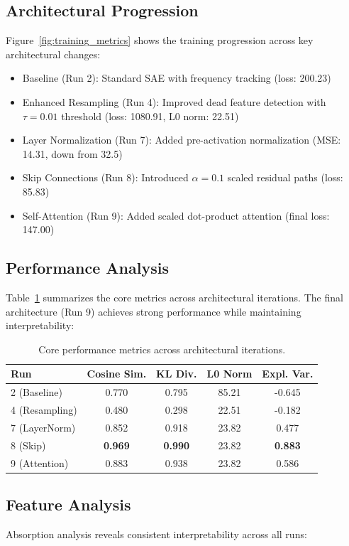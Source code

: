 \documentclass{article} %
\begin{document}
\subsection{Architectural Progression}
Figure~\ref{fig:training_metrics} shows the training progression across key architectural changes:

\begin{itemize}
    \item Baseline (Run 2): Standard SAE with frequency tracking (loss: 200.23)
    \item Enhanced Resampling (Run 4): Improved dead feature detection with $\tau=0.01$ threshold (loss: 1080.91, L0 norm: 22.51)
    \item Layer Normalization (Run 7): Added pre-activation normalization (MSE: 14.31, down from 32.5)
    \item Skip Connections (Run 8): Introduced $\alpha=0.1$ scaled residual paths (loss: 85.83)
    \item Self-Attention (Run 9): Added scaled dot-product attention (final loss: 147.00)
\end{itemize}

\subsection{Performance Analysis}
Table~\ref{tab:core_metrics} summarizes the core metrics across architectural iterations. The final architecture (Run 9) achieves strong performance while maintaining interpretability:

\begin{table}[h]
\centering
\begin{tabular}{lcccc}
\toprule
Run & Cosine Sim. & KL Div. & L0 Norm & Expl. Var. \\
\midrule
2 (Baseline) & 0.770 & 0.795 & 85.21 & -0.645 \\
4 (Resampling) & 0.480 & 0.298 & 22.51 & -0.182 \\
7 (LayerNorm) & 0.852 & 0.918 & 23.82 & 0.477 \\
8 (Skip) & \textbf{0.969} & \textbf{0.990} & 23.82 & \textbf{0.883} \\
9 (Attention) & 0.883 & 0.938 & 23.82 & 0.586 \\
\bottomrule
\end{tabular}
\caption{Core performance metrics across architectural iterations.}
\label{tab:core_metrics}
\end{table}

\subsection{Feature Analysis}
Absorption analysis reveals consistent interpretability across all runs:
\end{document}
